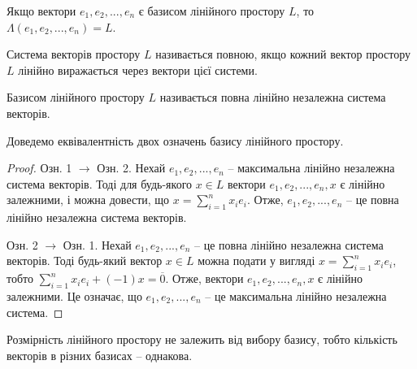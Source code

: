 \begin{claim}
	Якщо вектори $e_1, e_2, ..., e_n$ є базисом лінійного простору $L$, то
	$\Lambda(e_1, e_2, ..., e_n) = L$.
\end{claim}

\begin{definition}
	Система векторів простору $L$ називається повною, якщо кожний вектор
	простору $L$ лінійно виражається через вектори цієї системи.
\end{definition}

\begin{definition}
	Базисом лінійного простору $L$ називається повна лінійно незалежна
	система векторів.
\end{definition}

Доведемо еквівалентність двох означень базису лінійного простору.
\begin{proof}
	Озн. 1 $\rightarrow$ Озн. 2. Нехай $e_1, e_2, ..., e_n$ -- максимальна лінійно незалежна система
	векторів. Тоді для будь-якого $x \in L$ вектори $e_1, e_2, ..., e_n, x$ є лінійно залежними, і
	можна довести, що $x = \sum\limits_{i=1}^n x_ie_i$. Отже, $e_1, e_2, ..., e_n$ -- це повна
	лінійно незалежна система векторів.

	Озн. 2 $\rightarrow$ Озн. 1. Нехай $e_1, e_2, ..., e_n$ -- це повна лінійно незалежна система
	векторів. Тоді будь-який вектор $x \in L$ можна подати у вигляді $x = \sum\limits_{i=1}^n x_ie_i$, тобто
	$\sum\limits_{i=1}^n x_ie_i + (-1)x = \overline{0}$. Отже, вектори $e_1, e_2, ..., e_n, x$ є лінійно
	залежними. Це означає, що $e_1, e_2, ..., e_n$ -- це максимальна лінійно незалежна система.
\end{proof}

\begin{claim}
	Розмірність лінійного простору не залежить від вибору базису, тобто
	кількість векторів в різних базисах – однакова.
\end{claim}


